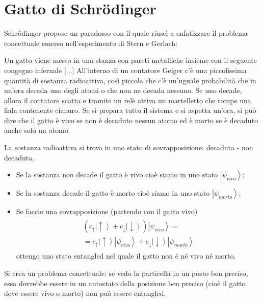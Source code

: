 \section{Gatto di Schrödinger} %
Schrödinger propose un paradosso con il quale riuscì a enfatizzare il problema concettuale emerso nell'esperimento di Stern e Gerlach:

Un gatto viene messo in una stanza con pareti metalliche insieme con il seguente congegno infernale [...] All'interno di un contatore Geiger c'è una piccolissima quantità di sostanza radioattiva, così piccola che c'è un'uguale probabilità che in un'ora decada uno degli atomi o che non ne decada nessuno. Se uno decade, allora il contatore scatta e tramite un relè attiva un martelletto che rompe una fiala contenente cianuro. Se si prepara tutto il sistema e si aspetta un'ora, si può dire che il gatto è vivo se non è decaduto nessun atomo ed è morto se è decaduto anche solo un atomo.

La sostanza radioattiva si trova in uno stato di sovrapposizione: decaduta - non decaduta.
\begin{itemize}
\item Se la sostanza non decade il gatto è vivo cioè siamo in uno stato $\left|\psi_{vivo}\right\rangle$;
\item Se la sostanza decade il gatto è morto cioè siamo in uno stato $\left|\psi_{morto}\right\rangle$;
\item Se faccio una sovrapposizione (partendo con il gatto vivo)
\begin{equation}\begin{split}\begin{split}
(c_{\uparrow}\left|\uparrow\right\rangle + c_{\downarrow}\left|\downarrow\right\rangle)\left|\psi_{vivo}\right\rangle=\\
=c_{\uparrow}\left|\uparrow\right\rangle\left|\psi_{vivo}\right\rangle + c_{\downarrow}\left|\downarrow\right\rangle\left|\psi_{morto}\right\rangle
\end{split}\end{split}\end{equation}
ottengo uno stato entangled nel quale il gatto non è né vivo né morto.
\end{itemize}

Si crea un problema concettuale: se vedo la particella in un posto ben preciso, essa dovrebbe essere in un autostato della posizione ben preciso (cioè il gatto dove essere vivo o morto) non può essere entangled.

